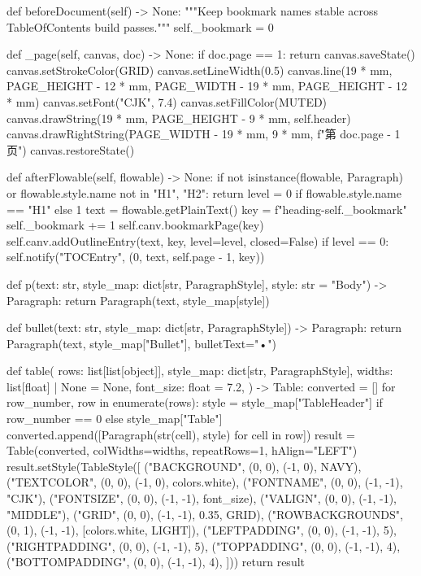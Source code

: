 \documentclass[UTF8,a4paper,fontset=fandol]{ctexart}
\begin{document}
\begin{ProjectCode}
{    def beforeDocument(self) -> None:
        """Keep bookmark names stable across TableOfContents build passes."""
        self._bookmark = 0

    def _page(self, canvas, doc) -> None:
        if doc.page == 1:
            return
        canvas.saveState()
        canvas.setStrokeColor(GRID)
        canvas.setLineWidth(0.5)
        canvas.line(19 * mm, PAGE_HEIGHT - 12 * mm, PAGE_WIDTH - 19 * mm, PAGE_HEIGHT - 12 * mm)
        canvas.setFont("CJK", 7.4)
        canvas.setFillColor(MUTED)
        canvas.drawString(19 * mm, PAGE_HEIGHT - 9 * mm, self.header)
        canvas.drawRightString(PAGE_WIDTH - 19 * mm, 9 * mm, f"第 {doc.page - 1} 页")
        canvas.restoreState()

    def afterFlowable(self, flowable) -> None:
        if not isinstance(flowable, Paragraph) or flowable.style.name not in {"H1", "H2"}:
            return
        level = 0 if flowable.style.name == "H1" else 1
        text = flowable.getPlainText()
        key = f"heading-{self._bookmark}"
        self._bookmark += 1
        self.canv.bookmarkPage(key)
        self.canv.addOutlineEntry(text, key, level=level, closed=False)
        if level == 0:
            self.notify("TOCEntry", (0, text, self.page - 1, key))


def p(text: str, style_map: dict[str, ParagraphStyle], style: str = "Body") -> Paragraph:
    return Paragraph(text, style_map[style])


def bullet(text: str, style_map: dict[str, ParagraphStyle]) -> Paragraph:
    return Paragraph(text, style_map["Bullet"], bulletText="•")


def table(
    rows: list[list[object]],
    style_map: dict[str, ParagraphStyle],
    widths: list[float] | None = None,
    font_size: float = 7.2,
) -> Table:
    converted = []
    for row_number, row in enumerate(rows):
        style = style_map["TableHeader"] if row_number == 0 else style_map["Table"]
        converted.append([Paragraph(str(cell), style) for cell in row])
    result = Table(converted, colWidths=widths, repeatRows=1, hAlign="LEFT")
    result.setStyle(TableStyle([
        ("BACKGROUND", (0, 0), (-1, 0), NAVY),
        ("TEXTCOLOR", (0, 0), (-1, 0), colors.white),
        ("FONTNAME", (0, 0), (-1, -1), "CJK"),
        ("FONTSIZE", (0, 0), (-1, -1), font_size),
        ("VALIGN", (0, 0), (-1, -1), "MIDDLE"),
        ("GRID", (0, 0), (-1, -1), 0.35, GRID),
        ("ROWBACKGROUNDS", (0, 1), (-1, -1), [colors.white, LIGHT]),
        ("LEFTPADDING", (0, 0), (-1, -1), 5),
        ("RIGHTPADDING", (0, 0), (-1, -1), 5),
        ("TOPPADDING", (0, 0), (-1, -1), 4),
        ("BOTTOMPADDING", (0, 0), (-1, -1), 4),
    ]))
    return result


}
\end{ProjectCode}
\end{document}
